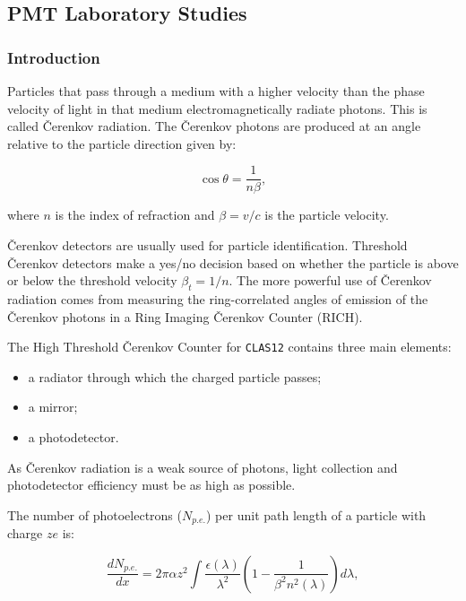 \subsection{PMT Laboratory Studies}

\subsubsection{Introduction}

Particles that pass through a medium with a higher velocity than the
phase velocity of light in that medium electromagnetically radiate
photons.  This is called {\v C}erenkov radiation.  The {\v C}erenkov 
photons are produced at an angle relative to the particle direction given by:

\begin{equation}
\cos\theta = \frac{1}{n\beta},
\end{equation}

\noindent
where $n$ is the index of refraction and $\beta=v/c$ is the particle 
velocity.

{\v C}erenkov detectors are usually used for particle identification.
Threshold {\v C}erenkov detectors make a yes/no decision based on whether 
the particle is above or below the threshold velocity $\beta_t=1/n$.
The more powerful use of {\v C}erenkov radiation comes from measuring the 
ring-correlated angles of emission of the {\v C}erenkov photons in a 
Ring Imaging {\v C}erenkov Counter (RICH).

The High Threshold {\v C}erenkov Counter for {\tt CLAS12} contains three 
main elements:

\begin{itemize}
\item a radiator through which the charged particle passes;
\item a mirror;
\item a photodetector.
\end {itemize} 

As  {\v C}erenkov radiation is a weak source of photons, light collection 
and photodetector efficiency must be as high as possible.

The number of photoelectrons ($N_{p.e.}$) per unit path length of a particle 
with charge $ze$ is:

\begin{equation}
\frac{dN_{p.e.}}{dx}=2\pi\alpha z^2\int{\frac {\epsilon(\lambda)}{\lambda^2}\displaystyle\left(1-\frac{1}{\beta^2n^2(\lambda)}\right)d\lambda},
\end{equation}


